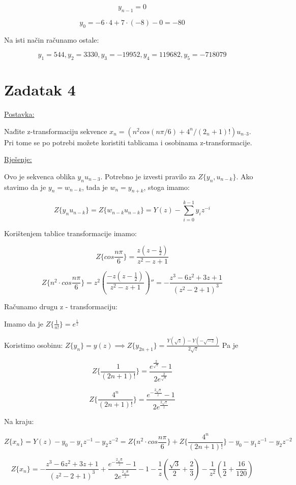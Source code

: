 \documentclass[12pt]{article}
\begin{document}
$$y_{n - 1} = 0$$

$$y_0 = -6 \cdot 4 + 7 \cdot (-8) - 0 = - 80$$

Na isti način računamo ostale:

$$y_1 = 544, y_2 = 3330, y_3 = -19952, y_4 = 119682, y_5 = -718079$$

\newpage

\section*{Zadatak 4\label{Z4}}

\underline{Postavka:}

Nađite z-transformaciju sekvence $x_n = (n^2 cos (n \pi / 6) + 4^n / (2_n + 1)! ) u_{n–3}$. Pri tome se po potrebi možete koristiti tablicama i osobinama z-transformacije.

\underline{Rješenje:}

Ovo je sekvenca oblika $y_n u_{n-3}$. Potrebno je izvesti pravilo za $Z\{y_n, u_{n - k}\}$. Ako stavimo da je $y_n = w_{n - k}$, tada je $w_n = y_{n + k}$, stoga imamo:

$$Z\{y_n u_{n - k}\} = Z\{w_{n-k} u_{n - k}\} = Y(z) - \sum_{i = 0}^{k - 1} y_i z^{-i}$$

Korištenjem tablice transformacije imamo:

$$Z\{cos \frac{n \pi}{6}\} = \frac{z (z - \frac{1}{2})}{z^2 - z + 1}$$

$$Z\{n^2 \cdot cos \frac{n \pi}{6}\} = z^2 (\frac{-z (z - \frac{1}{2})}{z^2 - z + 1}) '' = - \frac{ z^3 - 6z^2 + 3z + 1 }{(z^2 - 2 +1)^3}$$

Računamo drugu z - transformaciju:

Imamo da je $Z\{\frac{1}{n!}\} = e ^{\frac{1}{z}}$

Koristimo osobinu: $Z\{y_n\} = y(z) \implies Z\{y_{2n + 1}\} = \frac{Y(\sqrt{z}) - Y(- \sqrt{- z})}{2 \sqrt{z}}$
Pa je

$$Z\{ \frac{1}{(2n + 1)!} \} = \frac{e^{\frac{2}{\sqrt{z}}} - 1}{2 e ^{\frac{2}{\sqrt{z}}}}$$

$$Z\{ \frac{4^n}{(2n + 1)!}\} = \frac{  e^{ - \frac{2 \sqrt{z}}{z} } - 1  }{2 e^{ \frac{2 \sqrt{z}}{z}}}$$

Na kraju:

$$Z \{x_n\} = Y(z) - y_0 - y_1 z^{-1} - y_2 z^{-2} = Z\{n^2 \cdot cos \frac{n \pi}{6}\} + Z\{ \frac{4^n}{(2n + 1)!}\} - y_0 - y_1 z^{-1} - y_2 z^{-2}$$

$$Z \{x_n\} = - \frac{ z^3 - 6z^2 + 3z + 1 }{(z^2 - 2 +1)^3} + \frac{  e^{ - \frac{2 \sqrt{z}}{z} } - 1  }{2 e^{ \frac{2 \sqrt{z}}{z}}} - 1 - \frac{1}{z} (\frac{\sqrt{3}}{2} + \frac{2}{3}) - \frac{1}{z^2} (\frac{1}{2} + \frac{16}{120})$$
\end{document}

